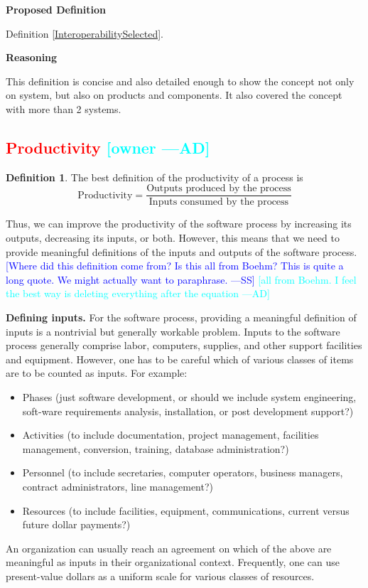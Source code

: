 \documentclass[letterpaper, cleveref]{lipics-v2019}
\newcommand{\authornote}[3]{\textcolor{#1}{[#3 ---#2]}}
\newcommand{\authornote}[3]{}
\newcommand{\wss}[1]{\authornote{blue}{SS}{#1}} %
\newcommand{\ad}[1]{\authornote{cyan}{AD}{#1}} %
\newcommand{\notdone}[1]{\textcolor{red}{#1}}
\theoremstyle{definition}
\newtheorem{defn}{Definition}
\begin{document}
\noindent \textbf{Proposed Definition}

Definition \ref{InteroperabilitySelected}.

\noindent \textbf{Reasoning}

This definition is concise and also detailed enough to show the concept not
only on system, but also on products and components. It also covered the
concept with more than 2 systems.


\subsection{\notdone{Productivity} \ad{owner}}

\begin{defn}
  The best definition of the productivity of a process is
	\[\text{Productivity} = \dfrac{\text{Outputs produced by the
              process}}{\text{Inputs consumed by the process}}\]

Thus, we can improve the productivity of the software process by increasing its
outputs, decreasing its inputs, or both. However, this means that we need to
provide meaningful definitions of the inputs and outputs of the software
process. \wss{Where did this definition come from?  Is this all from Boehm?
  This is quite a long quote.  We might actually want to paraphrase.}
\ad{all from Boehm. I feel the best way is deleting everything after the
equation}

\textbf{Defining inputs.} For the software process, providing a meaningful
definition of inputs is a nontrivial but generally workable problem. Inputs to
the software process generally comprise labor, computers, supplies, and other
support facilities and equipment. However, one has to be careful which of
various classes of items are to be counted as inputs. For example:
\begin{itemize}
\item Phases (just software development, or should we include system
engineering, soft-ware requirements analysis, installation, or post development
support?)
\item Activities (to include documentation, project management, facilities
management, conversion, training, database administration?)
\item Personnel (to include secretaries, computer operators, business managers,
contract administrators, line management?)
\item Resources (to include facilities, equipment, communications, current
versus future dollar payments?)
\end{itemize}
An organization can usually reach an agreement on which of the above are
meaningful as inputs in their organizational context. Frequently, one can use
present-value dollars as a uniform scale for various classes of resources.


\end{defn}
\end{document}

